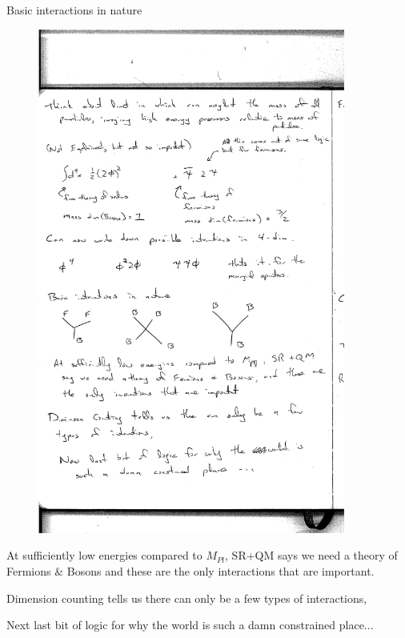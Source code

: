 {Basic interactions in nature
\begin{figure}[h]
\centering
\includegraphics[width=0.9\textwidth]{./Interactions.pdf}
\end{figure}

At sufficiently low energies compared to $M_{Pl}$, SR+QM says we need a theory of Fermions \& Bosons and these are the only interactions that are important. 

Dimension counting tells us there can only be a few types of interactions, 

Next last bit of logic for why the world is such a damn constrained place...



}




